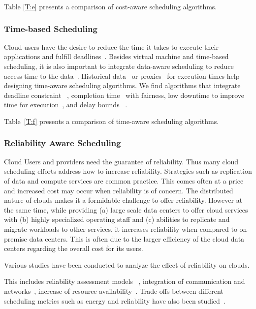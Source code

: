 \documentclass[final,5p,times,twocolumn]{elsarticle}
\begin{document}
Table \ref{T:e} presents a comparison of cost-aware scheduling algorithms.

%

\subsubsection{Time-based Scheduling}\label{sec:time}


Cloud users have the desire to reduce the time it takes to execute their applications and fulfill deadlines~\cite{arabnejad2017scheduling}. Besides virtual machine and time-based scheduling, it is also important to integrate data-aware scheduling to reduce access time to the data~\cite{vandenbosshe2013}. Historical data~\cite{thomas2015credit} or proxies~\cite{erdil2013autonomic} for execution times help designing time-aware scheduling algorithms. We find algorithms that integrate deadline constraint ~\cite{li2016energy}, completion time~\cite{xu2011job} with fairness, low downtime to improve time for execution~\cite{frincu2014scheduling}, and delay bounds ~\cite{yuan2017time}.

Table~\ref{T:f} presents a comparison of time-aware scheduling algorithms.

%

\subsubsection{Reliability Aware Scheduling}\label{sec:reliability}



Cloud Users and providers need the guarantee of reliability. Thus many cloud scheduling efforts address how to increase reliability. Strategies such as replication of data and compute services are common practice. This comes often at a price and increased cost may occur when reliability is of concern. The distributed nature of clouds makes it a formidable challenge to offer reliability. However at the same time, while providing (a) large scale data centers to offer cloud services with (b) highly specialized operating staff and (c) abilities to replicate and migrate workloads to other services, it increases reliability when compared to on-premise data centers. This is often due to the larger efficiency of the cloud data centers regarding the overall cost for its users.

Various studies have been conducted to analyze the effect of reliability on clouds.

This includes reliability assessment models ~\cite{malik2012reliability}, integration of communication and networks~\cite{jing2015reliability}, increase of resource availability~\cite{latiff2016fault}. Trade-offs between different scheduling metrics such as energy and reliability have also been studied~\cite{tang2016energy}.
\end{document}
